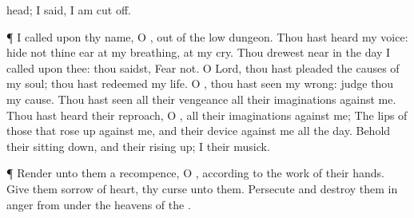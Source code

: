 {head;
{} I
said, I am cut
off.
\par }{\PP {}¶ I
called upon thy
name, O
{}, out of the
low
dungeon.
Thou hast
heard my
voice:
hide not thine
ear at my
breathing, at my
cry.
Thou drewest
near in the
day
{} I
called upon thee: thou
saidst,
Fear not.
O
Lord, thou hast
pleaded the
causes of my
soul; thou hast
redeemed my
life.
O
{}, thou hast
seen my
wrong:
judge thou my
cause.
Thou hast
seen all their
vengeance
{} all their
imaginations against me.
Thou hast
heard their
reproach, O
{},
{} all their
imaginations against me;
The
lips of those that rose
up against me, and their
device against me all the
day.
Behold their sitting
down, and their rising
up; I
{} their
musick.
\par }{\PP {}¶
Render unto them a
recompence, O
{}, according to the
work of their
hands.
Give them
sorrow of
heart, thy
curse unto them.
Persecute and
destroy them in
anger from under the
heavens of the
{}.

}

